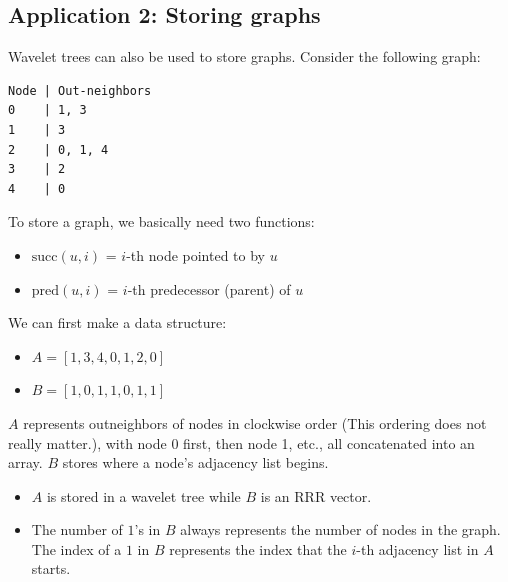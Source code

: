 \documentclass[10pt]{article}
\begin{document}
\subsection*{Application 2: Storing graphs}
Wavelet trees can also be used to store graphs.  Consider the following graph:
\begin{center}
\end{center}
\begin{verbatim}
Node | Out-neighbors
0    | 1, 3
1    | 3
2    | 0, 1, 4
3    | 2
4    | 0
\end{verbatim}
To store a graph, we basically need two functions:
\begin{itemize}
	\item $\text{succ}(u, i)$ = $i$-th node pointed to by $u$
	\item $\text{pred}(u, i)$ = $i$-th predecessor (parent) of $u$
\end{itemize}
We can first make a data structure:
\begin{itemize}
	\item $A = [1, 3, 4, 0, 1, 2, 0]$
	\item $B = [1, 0, 1, 1, 0, 1, 1]$
\end{itemize}
$A$ represents outneighbors of nodes in clockwise order (This ordering does not really matter.), with node 0 first, then node 1, etc., all concatenated into an array.  $B$ stores where a node's adjacency list begins.
\begin{itemize}
	\item $A$ is stored in a wavelet tree while $B$ is an RRR vector.
	\item The number of $1$'s in $B$ always represents the number of nodes in the graph.  The index of a $1$ in $B$ represents the index that the $i$-th adjacency list in $A$ starts.
\end{itemize}
\end{document}
